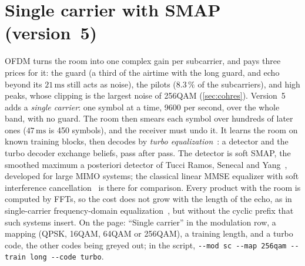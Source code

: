 \documentclass[11pt,a4paper]{article}
\newcommand{\ms}{\,\mathrm{ms}}
\newcommand{\code}[1]{\texttt{#1}}
\theoremstyle{remark}
\begin{document}
\section{Single carrier with SMAP (version~5)}
\label{sec:sc}
OFDM turns the room into one complex gain per subcarrier, and pays three prices for it: the guard (a third of the airtime with the long guard, and echo beyond its $21\ms$ still acts as noise), the pilots ($8.3\,\%$ of the subcarriers), and high peaks, whose clipping is the largest noise of 256QAM (\cref{sec:cohres}). Version~5 adds a \emph{single carrier}: one symbol at a time, 9600 per second, over the whole band, with no guard. The room then smears each symbol over hundreds of later ones ($47\ms$ is 450 symbols), and the receiver must undo it. It learns the room on known training blocks, then decodes by \emph{turbo equalization}~\cite{douillard,tuchlertcom}: a detector and the turbo decoder exchange beliefs, pass after pass. The detector is soft SMAP, the smoothed maximum a posteriori detector of Tucci Ramos, Senecal and Yang~\cite{smap}, developed for large MIMO systems; the classical linear MMSE equalizer with soft interference cancellation~\cite{tuchlertsp} is there for comparison. Every product with the room is computed by FFTs, so the cost does not grow with the length of the echo, as in single-carrier frequency-domain equalization~\cite{falconer}, but without the cyclic prefix that such systems insert. On the page: ``Single carrier'' in the modulation row, a mapping (QPSK, 16QAM, 64QAM or 256QAM), a training length, and a turbo code, the other codes being greyed out; in the script, \code{-{}-mod sc -{}-map 256qam -{}-train long -{}-code turbo}.
\end{document}
